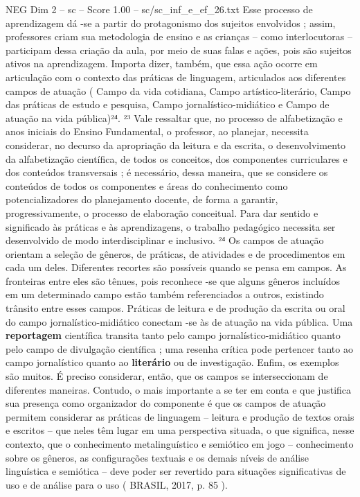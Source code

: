 \begin{textsample}{NEG Dim 2 – sc – Score 1.00 – sc/sc\_inf\_e\_ef\_26.txt}
Esse processo de aprendizagem dá -se a partir do protagonismo dos sujeitos envolvidos ; assim, professores criam sua metodologia de ensino e as crianças – como interlocutoras – participam dessa criação da aula, por meio de suas falas e ações, pois são sujeitos ativos na aprendizagem.
Importa dizer, também, que essa ação ocorre em articulação com o contexto das práticas de linguagem, articulados aos diferentes campos de atuação ( Campo da vida cotidiana, Campo artístico-literário, Campo das práticas de estudo e pesquisa, Campo jornalístico-midiático e Campo de atuação na vida pública)²⁴. ²³ Vale ressaltar que, no processo de alfabetização e anos iniciais do Ensino Fundamental, o professor, ao planejar, necessita considerar, no decurso da apropriação da leitura e da escrita, o desenvolvimento da alfabetização científica, de todos os conceitos, dos componentes curriculares e dos conteúdos transversais ; é necessário, dessa maneira, que se considere os conteúdos de todos os componentes e áreas do conhecimento como potencializadores do planejamento docente, de forma a garantir, progressivamente, o processo de elaboração conceitual.
Para dar sentido e significado às práticas e às aprendizagens, o trabalho pedagógico necessita ser desenvolvido de modo interdisciplinar e inclusivo. ²⁴ Os campos de atuação orientam a seleção de gêneros, de práticas, de atividades e de procedimentos em cada um deles.
Diferentes recortes são possíveis quando se pensa em campos.
As fronteiras entre eles são tênues, pois reconhece -se que alguns gêneros incluídos em um determinado campo estão também referenciados a outros, existindo trânsito entre esses campos.
Práticas de leitura e de produção da escrita ou oral do campo jornalístico-midiático conectam -se às de atuação na vida pública.
Uma \textbf{reportagem} científica transita tanto pelo campo jornalístico-midiático quanto pelo campo de divulgação científica ; uma resenha crítica pode pertencer tanto ao campo jornalístico quanto ao \textbf{literário} ou de investigação.
Enfim, os exemplos são muitos.
É preciso considerar, então, que os campos se interseccionam de diferentes maneiras.
Contudo, o mais importante a se ter em conta e que justifica sua presença como organizador do componente é que os campos de atuação permitem considerar as práticas de linguagem – leitura e produção de textos orais e escritos – que neles têm lugar em uma perspectiva situada, o que significa, nesse contexto, que o conhecimento metalinguístico e semiótico em jogo – conhecimento sobre os gêneros, as configurações textuais e os demais níveis de análise linguística e semiótica – deve poder ser revertido para situações significativas de uso e de análise para o uso ( BRASIL, 2017, p. 85 ).

\end{textsample}
